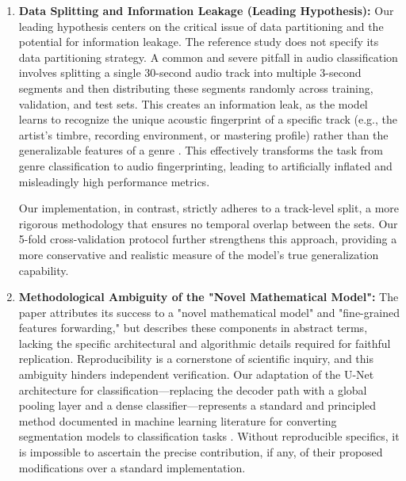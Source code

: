 \documentclass[11pt,a4paper]{article}
\begin{document}
\begin{enumerate}
    \item \textbf{Data Splitting and Information Leakage (Leading Hypothesis):} Our leading hypothesis centers on the critical issue of data partitioning and the potential for information leakage. The reference study does not specify its data partitioning strategy. A common and severe pitfall in audio classification involves splitting a single 30-second audio track into multiple 3-second segments and then distributing these segments randomly across training, validation, and test sets. This creates an information leak, as the model learns to recognize the unique acoustic fingerprint of a specific track (e.g., the artist's timbre, recording environment, or mastering profile) rather than the generalizable features of a genre \textbf{\cite{salamon2017data_leakage}}. %
    This effectively transforms the task from genre classification to audio fingerprinting, leading to artificially inflated and misleadingly high performance metrics.

    Our implementation, in contrast, strictly adheres to a track-level split, a more rigorous methodology that ensures no temporal overlap between the sets. Our 5-fold cross-validation protocol further strengthens this approach, providing a more conservative and realistic measure of the model's true generalization capability.

    \item \textbf{Methodological Ambiguity of the "Novel Mathematical Model":} The paper attributes its success to a "novel mathematical model" and "fine-grained features forwarding," but describes these components in abstract terms, lacking the specific architectural and algorithmic details required for faithful replication. Reproducibility is a cornerstone of scientific inquiry, and this ambiguity hinders independent verification. Our adaptation of the U-Net architecture for classification—replacing the decoder path with a global pooling layer and a dense classifier—represents a standard and principled method documented in machine learning literature for converting segmentation models to classification tasks \textbf{\cite{ronneberger2015unet}}. %
    Without reproducible specifics, it is impossible to ascertain the precise contribution, if any, of their proposed modifications over a standard implementation.


\end{enumerate}
\end{document}
